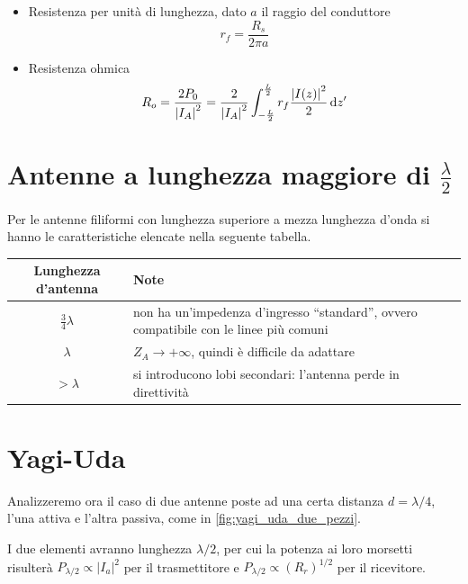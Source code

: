\begin{itemize}
	\item Resistenza per unità di lunghezza, dato $a$ il raggio del conduttore
	\begin{equation}
		r_f = \frac{R_s}{2\pi a}
	\end{equation}

	\item Resistenza ohmica
	\begin{equation}
		R_o
		= \frac{2 P_0}{\left |I_A \right |^{2}}
		= \frac{2}{\left |I_A \right |^{2}} \int_{-\frac{L}{2}}^{\frac{L}{2}} r_f \frac{\left |I(z) \right |^{2}}{2} \mathop{}\!\mathrm{d} z^\prime
	\end{equation}
\end{itemize}

\section{Antenne a lunghezza maggiore di $\frac{\lambda}{2}$}
Per le antenne filiformi con lunghezza superiore a mezza lunghezza d'onda si hanno le caratteristiche elencate nella seguente tabella.

\begin{table}[hb!]
	\centering
	\begin{tabular}{cC{8cm}}
		\toprule
		Lunghezza d'antenna & Note\\
		\midrule
		 \vspace{2mm}
		$\frac{3}{4}\lambda$ & non ha un'impedenza d'ingresso  ``standard'', ovvero compatibile con le linee più comuni \\ \vspace{2mm}
		$\lambda$ & $Z_A \to +\infty$, quindi è difficile da adattare \\
		$>\lambda$ & si introducono lobi secondari: l'antenna perde in direttività \\
		\bottomrule
	\end{tabular}
\end{table}

\section{Yagi-Uda}
Analizzeremo ora il caso di due antenne poste ad una certa distanza $d = \lambda / 4$, l'una attiva e l'altra passiva, come in \autoref{fig:yagi_uda_due_pezzi}.

I due elementi avranno lunghezza $\lambda/2$, per cui la potenza ai loro morsetti risulterà $P_{\lambda/2}\propto \left | I_a \right |^2$ per il trasmettitore e $P_{\lambda/2}\propto (R_r)^{1/2}$ per il ricevitore.

